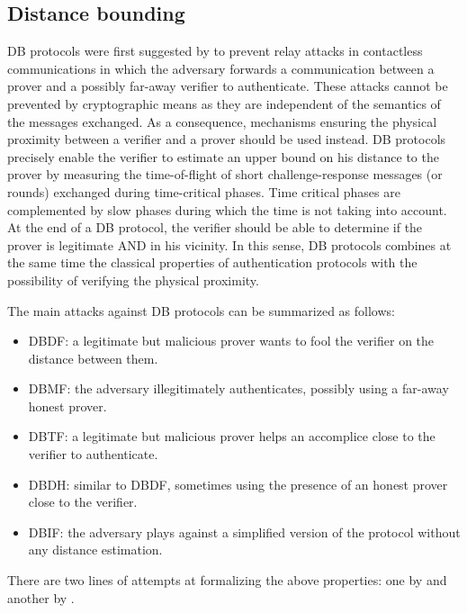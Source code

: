 \subsection{Distance bounding}%
\label{DistanceBounding}

\Ac{DB} protocols were first suggested by \citet{DistanceBounding} to prevent relay attacks in contactless communications in which the adversary forwards a communication between a prover and a possibly far-away verifier to authenticate. 
These attacks cannot be prevented by cryptographic means as they are independent of the semantics of the messages exchanged.
As a consequence, mechanisms ensuring the physical proximity between a verifier and a prover should be used instead.
\Ac{DB} protocols precisely enable the verifier to estimate an upper bound on his distance to the prover by measuring the time-of-flight of short challenge-response messages (or rounds) exchanged during time-critical phases. 
Time critical phases are complemented by slow phases during which the time is not taking into account. 
At the end of a \Ac{DB} protocol, the verifier should be able to determine if the prover is legitimate AND in his vicinity.
In this sense, \Ac{DB} protocols combines at the same time the classical properties of authentication protocols with the possibility of verifying the physical proximity.

The main attacks against \ac{DB} protocols can be summarized as follows:
\begin{itemize}
  \item \acf{DBDF}: a legitimate but malicious prover wants to fool the verifier on the distance between them.
  \item \acf{DBMF}: the adversary illegitimately authenticates, possibly using a far-away honest prover.
  \item \acf{DBTF}: a legitimate but malicious prover helps an accomplice close to the verifier to authenticate.
  \item \acf{DBDH}: similar to \ac{DBDF}, sometimes using the presence of an honest prover close to the verifier.
  \item \acf{DBIF}: the adversary plays against a simplified version of the protocol without any distance estimation.
\end{itemize}
There are two lines of attempts at formalizing the above properties: one by \citet{DB-BMV} and another by \citet{DB-DFKO}.

